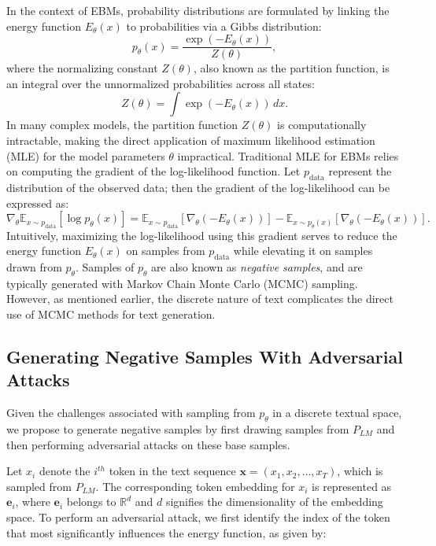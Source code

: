 \documentclass[11pt]{article}
\begin{document}
In the context of EBMs, probability distributions are formulated by linking the energy function \( E_\theta(x) \) to probabilities via a Gibbs distribution:
\begin{equation}
p_\theta(x) = \frac{\exp \left(-E_\theta(x)\right)}{Z(\theta)},
\end{equation}
where the normalizing constant \( Z(\theta) \), also known as the partition function, is an integral over the unnormalized probabilities across all states:
\begin{equation}
Z(\theta) = \int \exp \left(-E_\theta(x)\right) \, dx.
\end{equation}
In many complex models, the partition function \( Z(\theta) \) is computationally intractable, making the direct application of maximum likelihood estimation (MLE) for the model parameters \( \theta \) impractical. Traditional MLE for EBMs relies on computing the gradient of the log-likelihood function. Let \( p_{\text{data}} \) represent the distribution of the observed data; then the gradient of the log-likelihood can be expressed as:
\begin{equation}
\nabla_\theta \mathbb{E}_{x \sim p_{\text{data}}}\left[\log p_\theta(x)\right] = \mathbb{E}_{x \sim p_{\text{data}}}\left[\nabla_\theta (-E_\theta(x))\right] - \mathbb{E}_{x \sim p_\theta(x)}\left[\nabla_\theta (-E_\theta(x))\right].
\end{equation}
Intuitively, maximizing the log-likelihood using this gradient serves to reduce the energy function \( E_\theta(x) \) on samples from \( p_{\text{data}} \) while elevating it on samples drawn from \( p_\theta \). Samples of \( p_\theta \) are also known as \emph{negative samples}, and are typically generated with Markov Chain Monte Carlo (MCMC) sampling. However, as mentioned earlier, the discrete nature of text complicates the direct use of MCMC methods for text generation. 


\subsection{Generating Negative Samples With Adversarial Attacks}
\label{sec:attack}
Given the challenges associated with sampling from \( p_\theta \) in a discrete textual space, we propose to generate negative samples by first drawing samples from  \( P_{LM}\) and then performing adversarial attacks on these base samples. 


Let \( x_i \) denote the \( i^{th} \) token in the text sequence \( \mathbf{x} = (x_1, x_2, \ldots, x_T) \), which is sampled from \( P_{LM} \). The corresponding token embedding for \( x_i \) is represented as \( \mathbf{e}_i \), where \( \mathbf{e}_i \) belongs to \( \mathbb{R}^d \) and \( d \) signifies the dimensionality of the embedding space. To perform an adversarial attack, we first identify the index of the token that most significantly influences the energy function, as given by:
\end{document}
